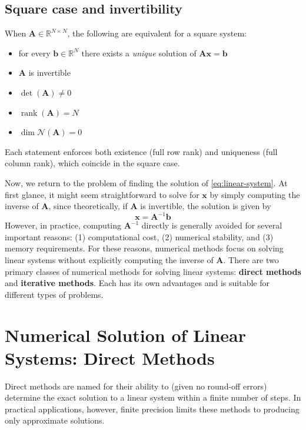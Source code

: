 \subsection{Square case and invertibility} When $\mathbf{A}\in\mathbb{R}^{N\times N}$, the following are equivalent for a square system:
\begin{itemize}
    \item for every $\mathbf{b}\in\mathbb{R}^N$ there exists a \emph{unique} solution of $\mathbf{A}\mathbf{x}=\mathbf{b}$
    \item $\mathbf{A}$ is invertible
    \item $\det(\mathbf{A})\neq 0$
    \item $\operatorname{rank}(\mathbf{A})=N$
    \item $\dim\mathcal{N}(\mathbf{A})=0$
\end{itemize}
Each statement enforces both existence (full row rank) and uniqueness (full column rank), which coincide in the square case.

Now, we return to the problem of finding the solution of \autoref{eq:linear-system}. At first glance, it might seem straightforward to solve for $ \mathbf{x} $ by simply computing the inverse of $ \mathbf{A} $, since theoretically, if $ \mathbf{A} $ is invertible, the solution is given by
\begin{equation*}
    \mathbf{x} = \mathbf{A}^{-1}\mathbf{b}
\end{equation*}
However, in practice, computing $ \mathbf{A}^{-1} $ directly is generally avoided for several important reasons: (1) computational cost, (2) numerical stability, and (3) memory requirements. For these reasons, numerical methods focus on solving linear systems without explicitly computing the inverse of $ \mathbf{A} $. There are two primary classes of numerical methods for solving linear systems: \textbf{direct methods} and \textbf{iterative methods}. Each has its own advantages and is suitable for different types of problems.


\section{Numerical Solution of Linear Systems: Direct Methods}
\label{sec:num_sol_linear_direct}
Direct methods are named for their ability to (given no round-off errors) determine the exact solution to a linear system within a finite number of steps. In practical applications, however, finite precision limits these methods to producing only approximate solutions.

